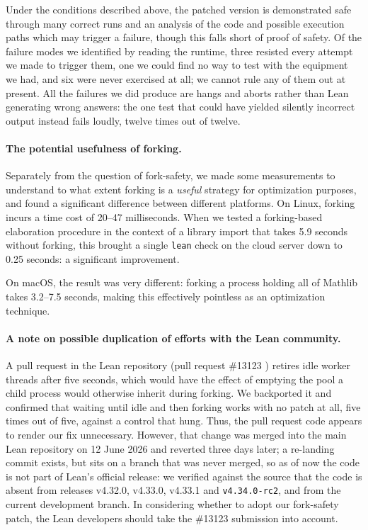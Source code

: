 \documentclass{article}
\newcommand{\Lean}{Lean\xspace}      %
\newcommand{\lean}{\texttt{lean}\xspace}      %
\newcommand{\mathlib}{Mathlib\xspace}
\newcommand{\leanreleasecandidate}{\texttt{v4.34.0-rc2}\xspace}
\begin{document}
Under the conditions described above, the patched version is demonstrated safe through many correct runs and an analysis of the code and possible execution paths which may trigger a failure, though this falls short of proof of safety. Of the failure modes we identified by reading the runtime, three resisted every attempt we made to trigger them, one we could find no way to test with the equipment we had, and six were never exercised at all; we cannot rule any of them out at present. 
All the failures we did produce are hangs and aborts rather than \Lean generating wrong answers: the one test that could have yielded silently incorrect output instead fails loudly, twelve times out of twelve.

\paragraph{The potential usefulness of forking.}
Separately from the question of fork-safety, we made some measurements to understand to what extent forking is a \emph{useful} strategy for optimization purposes, and found a significant difference between different platforms. On Linux, forking incurs a time cost of 20--47 milliseconds. When we tested a forking-based elaboration procedure in the context of a library import that takes 5.9 seconds without forking, this brought a single \lean check on the cloud server down to 0.25 seconds: a significant improvement.

On macOS, the result was very different: forking a process holding all of \mathlib takes 3.2--7.5 seconds, making this effectively pointless as an optimization technique.

\paragraph{A note on possible duplication of efforts with the \Lean community.}
A pull request in the \Lean repository (pull request \#13123 \cite{lean13123}) retires idle worker threads after five seconds, which would have the effect of emptying the pool a child process would otherwise inherit during forking. We backported it and confirmed that waiting until idle and then forking works with no patch at all, five times out of five, against a control that hung. Thus, the pull request code appears to render our fix unnecessary.
However, that change was merged into the main \Lean repository on 12 June 2026 and reverted three days later; a re-landing commit exists, but sits on a branch that was never merged, so as of now the code is not part of \Lean's official release: we verified against the source that the code is absent from releases v4.32.0, v4.33.0, v4.33.1 and \leanreleasecandidate, and from the current development branch. In considering whether to adopt our fork-safety patch, the \Lean developers should take the \#13123 submission into account.
\end{document}
